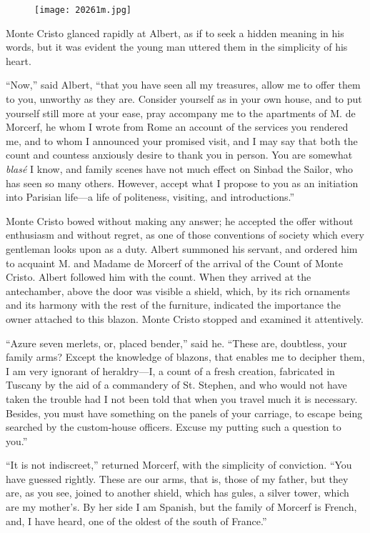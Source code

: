 \begin{figure}[h]
\texttt{[image: 20261m.jpg]}
\end{figure}

Monte Cristo glanced rapidly at Albert, as if to seek a hidden meaning
in his words, but it was evident the young man uttered them in the
simplicity of his heart.

“Now,” said Albert, “that you have seen all my treasures, allow me to
offer them to you, unworthy as they are. Consider yourself as in your
own house, and to put yourself still more at your ease, pray accompany
me to the apartments of M. de Morcerf, he whom I wrote from Rome an
account of the services you rendered me, and to whom I announced your
promised visit, and I may say that both the count and countess
anxiously desire to thank you in person. You are somewhat \textit{blasé} I
know, and family scenes have not much effect on Sinbad the Sailor, who
has seen so many others. However, accept what I propose to you as an
initiation into Parisian life—a life of politeness, visiting, and
introductions.”

Monte Cristo bowed without making any answer; he accepted the offer
without enthusiasm and without regret, as one of those conventions of
society which every gentleman looks upon as a duty. Albert summoned his
servant, and ordered him to acquaint M. and Madame de Morcerf of the
arrival of the Count of Monte Cristo. Albert followed him with the
count. When they arrived at the antechamber, above the door was visible
a shield, which, by its rich ornaments and its harmony with the rest of
the furniture, indicated the importance the owner attached to this
blazon. Monte Cristo stopped and examined it attentively.

“Azure seven merlets, or, placed bender,” said he. “These are,
doubtless, your family arms? Except the knowledge of blazons, that
enables me to decipher them, I am very ignorant of heraldry—I, a count
of a fresh creation, fabricated in Tuscany by the aid of a commandery
of St. Stephen, and who would not have taken the trouble had I not been
told that when you travel much it is necessary. Besides, you must have
something on the panels of your carriage, to escape being searched by
the custom-house officers. Excuse my putting such a question to you.”

“It is not indiscreet,” returned Morcerf, with the simplicity of
conviction. “You have guessed rightly. These are our arms, that is,
those of my father, but they are, as you see, joined to another shield,
which has gules, a silver tower, which are my mother’s. By her side I
am Spanish, but the family of Morcerf is French, and, I have heard, one
of the oldest of the south of France.”

